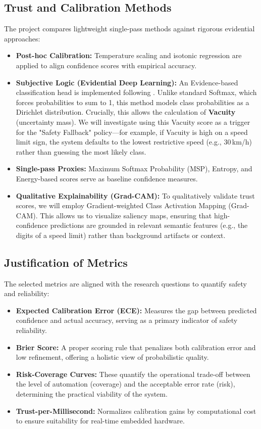 \documentclass[11pt,a4paper]{article}
\begin{document}
\subsection{Trust and Calibration Methods}
The project compares lightweight single-pass methods against rigorous evidential approaches:
\begin{itemize}
  \item \textbf{Post-hoc Calibration:} Temperature scaling and isotonic regression are applied to align confidence scores with empirical accuracy.
  \item \textbf{Subjective Logic (Evidential Deep Learning):} An Evidence-based classification head is implemented following \cite{sensoy2018evidential}. Unlike standard Softmax, which forces probabilities to sum to 1, this method models class probabilities as a Dirichlet distribution.
Crucially, this allows the calculation of \textbf{Vacuity} (uncertainty mass). We will investigate using this Vacuity score as a trigger for the "Safety Fallback" policy—for example, if Vacuity is high on a speed limit sign, the system defaults to the lowest restrictive speed (e.g., 30\,km/h) rather than guessing the most likely class.
  \item \textbf{Single-pass Proxies:} Maximum Softmax Probability (MSP), Entropy, and Energy-based scores \cite{liu2020energy} serve as baseline confidence measures.
  \item \textbf{Qualitative Explainability (Grad-CAM):} To qualitatively validate trust scores, we will employ Gradient-weighted Class Activation Mapping (Grad-CAM). This allows us to visualize saliency maps, ensuring that high-confidence predictions are grounded in relevant semantic features (e.g., the digits of a speed limit) rather than background artifacts or context.
\end{itemize}

\subsection{Justification of Metrics}
The selected metrics are aligned with the research questions to quantify safety and reliability:
\begin{itemize}
  \item \textbf{Expected Calibration Error (ECE):} Measures the gap between predicted confidence and actual accuracy, serving as a primary indicator of safety reliability.
  \item \textbf{Brier Score:} A proper scoring rule that penalizes both calibration error and low refinement, offering a holistic view of probabilistic quality.
  \item \textbf{Risk-Coverage Curves:} These quantify the operational trade-off between the level of automation (coverage) and the acceptable error rate (risk), determining the practical viability of the system.
  \item \textbf{Trust-per-Millisecond:} Normalizes calibration gains by computational cost to ensure suitability for real-time embedded hardware.
\end{itemize}
\end{document}
